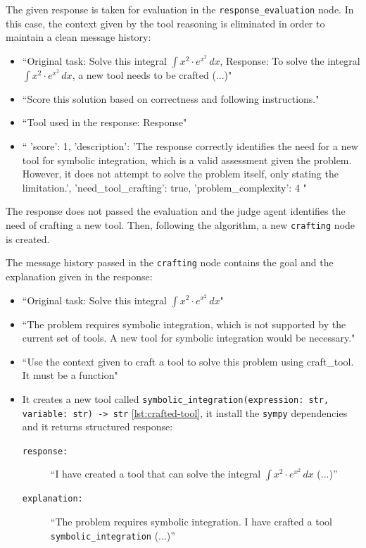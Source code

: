 \documentclass[12pt,a4paper,openright,twoside]{book}
\begin{document}
The given response is taken for evaluation in the \texttt{response\_evaluation} node. In this case, the context given by the tool reasoning is eliminated in order to maintain a clean message history:
\begin{itemize}
    \item[\textbf{Node Prompt:}] ``Original task: Solve this integral $\int x^2 \cdot e^{x^2} \, dx$, Response: To solve the integral $\int x^2 \cdot e^{x^2} \, dx$, a new tool needs to be crafted (...)"
    \item[\textbf{System:}] ``Score this solution based on correctness and following instructions."
    \item[\textbf{AI:}] ``Tool used in the response: Response"
    \item[\textbf{AI:}] ``{ 'score': 1, 'description': 'The response correctly identifies the need for a new tool for symbolic integration, which is a valid assessment given the problem. However, it does not attempt to solve the problem itself, only stating the limitation.', 'need\_tool\_crafting': true, 'problem\_complexity': 4 }"
\end{itemize}

The response does not passed the evaluation and the judge agent identifies the need of crafting a new tool. Then, following the algorithm, a new \texttt{crafting} node is created.

The message history passed in the \texttt{crafting} node contains the goal and the explanation given in the response:
\begin{itemize}
    \item[\textbf{Node Prompt:}] ``Original task: Solve this integral $\int x^2 \cdot e^{x^2} \, dx$"
    \item[\textbf{AI:}] ``The problem requires symbolic integration, which is not supported by the current set of tools. A new tool for symbolic integration would be necessary."
    \item[\textbf{System:}] ``Use the context given to craft a tool to solve this problem using craft\_tool. It must be a function"
    \item[\textbf{AI:}] It creates a new tool called \texttt{symbolic\_integration(expression: str, variable: str) -> str} \cref{lst:crafted-tool}, it install the \texttt{sympy} dependencies and it returns structured response: 
    \begin{description}
        \item[\texttt{response:}] ``I have created a tool that can solve the integral $\int x^2 \cdot e^{x^2} \, dx$ (...)'' 
        \item[\texttt{explanation:}] ``The problem requires symbolic integration. I have crafted a tool \texttt{symbolic\_integration} (...)''
    \end{description}
\end{itemize}
\end{document}
